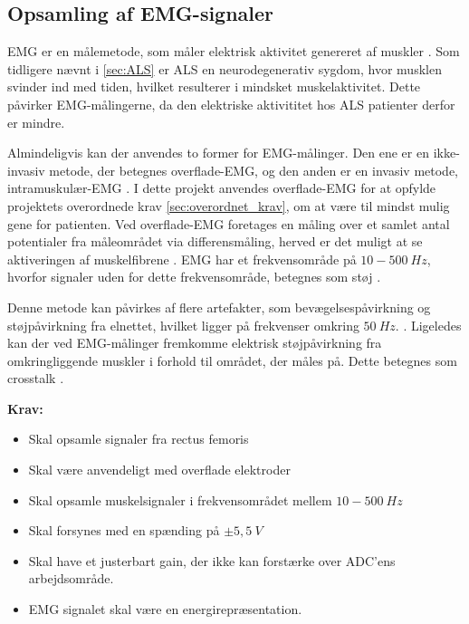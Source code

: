 \subsection{Opsamling af EMG-signaler} \label{EMG_krav}
EMG er en målemetode, som måler elektrisk aktivitet genereret af muskler \citep{chowdhury2013}. 
Som tidligere nævnt i \autoref{sec:ALS} er ALS en neurodegenerativ sygdom, hvor musklen svinder ind med tiden, hvilket resulterer i mindsket muskelaktivitet. Dette påvirker EMG-målingerne, da den elektriske aktivititet hos ALS patienter derfor er mindre.

Almindeligvis kan der anvendes to former for EMG-målinger. Den ene er en ikke-invasiv metode, der betegnes overflade-EMG, og den anden er en invasiv metode, intramuskulær-EMG \citep{chowdhury2013, keenan2012}. I dette projekt anvendes overflade-EMG for at opfylde projektets overordnede krav \autoref{sec:overordnet_krav}, om at være til mindst mulig gene for patienten. Ved overflade-EMG foretages en måling over et samlet antal potentialer fra måleområdet via differensmåling, herved er det muligt at se aktiveringen af muskelfibrene \citep{keenan2012}. EMG har et frekvensområde på $10-500~Hz$, hvorfor signaler uden for dette frekvensområde, betegnes som støj \citep{morre2003, keenan2012}.  

Denne metode kan påvirkes af flere artefakter, som bevægelsespåvirkning og støjpåvirkning fra elnettet, hvilket ligger på frekvenser omkring $50~Hz$. \citep{keenan2012}.
Ligeledes kan der ved EMG-målinger fremkomme elektrisk støjpåvirkning fra omkringliggende muskler i forhold til området, der måles på. Dette betegnes som crosstalk \citep{keenan2012}. 
\vspace{3mm}

\textbf{Krav:}
\begin{itemize}
\item Skal opsamle signaler fra rectus femoris
\item Skal være anvendeligt med overflade elektroder
\item Skal opsamle muskelsignaler i frekvensområdet mellem $10-500~Hz$
\item Skal forsynes med en spænding på $\pm5,5~V$ 
\item Skal have et justerbart gain, der ikke kan forstærke over ADC'ens arbejdsområde.
\item EMG signalet skal være en energirepræsentation.
\end{itemize}